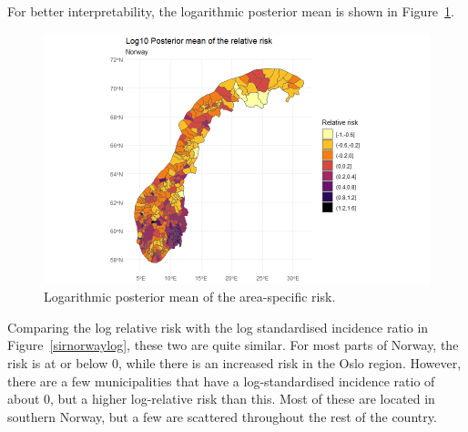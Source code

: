 %     
For better interpretability, the logarithmic posterior mean is shown in Figure~\ref{posteriorNorwayDemoLog}.
\begin{figure}[H]
    \centering
    \includegraphics[width = \textwidth]{posterior_norway_demo_log.png}
    \caption{Logarithmic posterior mean of the area-specific risk.}
    \label{posteriorNorwayDemoLog}
\end{figure}
%     
Comparing the log relative risk with the log standardised incidence ratio in Figure~\ref{sirnorwaylog}, these two are quite similar. For most parts of Norway, the risk is at or below 0, while there is an increased risk in the Oslo region. However, there are a few municipalities that have a log-standardised incidence ratio of about 0, but a higher log-relative risk than this. Most of these are located in southern Norway, but a few are scattered throughout the rest of the country.
